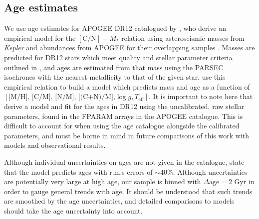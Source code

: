 \subsection{Age estimates}
\label{sec:ages}
We use age estimates for APOGEE DR12 catalogued by \citet{2016MNRAS.456.3655M}, who derive an empirical model for the $\mathrm{[C/N]} -M_*$ relation using asteroseismic masses from \emph{Kepler} and abundances from APOGEE for their overlapping samples \citep[APOKASC ][]{2014ApJS..215...19P}. Masses are predicted for DR12 stars which meet quality and stellar parameter criteria outlined in \citet{2016MNRAS.456.3655M}, and ages are estimated from that mass using the PARSEC isochrones with the nearest metallicity to that of the given star. \citet{2016MNRAS.456.3655M} use this empirical relation to build a model which predicts mass and age as a function of $[\text{[M/H], [C/M], [N/M], [(C+N)/M],}\log{g},T_{\mathrm{eff}}]$. It is important to note here that \citet{2016MNRAS.456.3655M} derive a model and fit for the ages in DR12 using the uncalibrated, raw stellar parameters, found in the FPARAM arrays in the APOGEE catalogue. This is difficult to account for when using the age catalogue alongside the calibrated parameters, and must be borne in mind in future comparisons of this work with models and observational results. 

Although individual uncertainties on ages are not given in the catalogue, \citet{2016MNRAS.456.3655M} state that the model predicts ages with r.m.s errors of $\sim 40\%$. Although uncertainties are potentially very large at high age, our sample is binned with $\Delta \text{age}= 2$ Gyr in order to gauge general trends with age. It should be understood that such trends are smoothed by the age uncertainties, and detailed comparisons to models should take the age uncertainty into account. 

